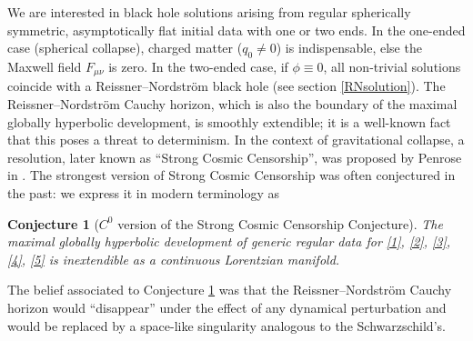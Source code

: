 \documentclass[10pt,a4paper]{article}
\theoremstyle{plain}
\newtheorem{conjecture}[thm]{Conjecture}
\theoremstyle{remark}
\theoremstyle{definition}
\theoremstyle{plain}
\theoremstyle{remark}
\theoremstyle{definition}
\numberwithin{equation}{section}
\begin{document}
 	We are interested in black hole solutions arising from regular spherically symmetric, asymptotically flat initial data with one or two ends. In the one-ended case (spherical collapse), charged matter ($q_0 \neq 0$) is indispensable, else the Maxwell field  $F_{\mu \nu}$ is zero\color{black}. In the two-ended case, if $\phi \equiv 0$, all non-trivial solutions coincide with a Reissner--Nordstr\"{o}m black hole (see section \ref{RNsolution}). The Reissner--Nordstr\"{o}m Cauchy horizon, which is also the boundary of the maximal globally hyperbolic development, is smoothly extendible; it is a well-known fact that this poses a threat to determinism. In the context of gravitational collapse, a resolution, later known as ``Strong Cosmic Censorship'', was proposed by Penrose in \cite{PenroseSCC}. The strongest version of Strong Cosmic Censorship was often conjectured in the past: we express it in modern terminology as \begin{conjecture}[$C^0$ version of the Strong Cosmic Censorship Conjecture] \label{C0SCC} The maximal globally hyperbolic development of generic regular data for \eqref{1}, \eqref{2}, \eqref{3}, \eqref{4}, \eqref{5} is inextendible as a continuous Lorentzian manifold.\end{conjecture} The belief associated to Conjecture \ref{C0SCC} was that the Reissner--Nordstr\"{o}m Cauchy horizon would ``disappear'' under the effect of any dynamical perturbation and would be replaced by a space-like singularity analogous to the Schwarzschild's.
 	
\end{document}
